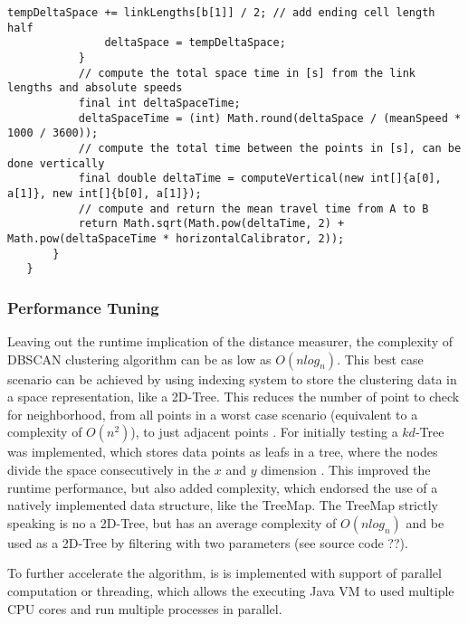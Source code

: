 \begin{lstlisting}[basicstyle=\tiny, style=java, caption={diagonal distance calculation}, label=lst:distance_calc_diagonal]
			   tempDeltaSpace += linkLengths[b[1]] / 2; // add ending cell length half
			   deltaSpace = tempDeltaSpace;
		   }
		   // compute the total space time in [s] from the link lengths and absolute speeds
		   final int deltaSpaceTime;
		   deltaSpaceTime = (int) Math.round(deltaSpace / (meanSpeed * 1000 / 3600));
		   // compute the total time between the points in [s], can be done vertically
		   final double deltaTime = computeVertical(new int[]{a[0], a[1]}, new int[]{b[0], a[1]});
		   // compute and return the mean travel time from A to B
		   return Math.sqrt(Math.pow(deltaTime, 2) + Math.pow(deltaSpaceTime * horizontalCalibrator, 2));
	   }
   }
\end{lstlisting}


\subsubsection{Performance Tuning}
Leaving out the runtime implication of the distance measurer, the complexity of DBSCAN clustering algorithm can be as low as $O(nlog_n)$. This best case scenario can be achieved by using indexing system to store the clustering data in a space representation, like a 2D-Tree. This reduces the number of point to check for neighborhood, from all points in a worst case scenario (equivalent to a complexity of $O(n^2)$), to just adjacent points \parencite{Chauhan2020}. For initially testing a $kd$-Tree was implemented, which stores data points as leafs in a tree, where the nodes divide the space consecutively in the $x$ and $y$ dimension \parencite{Hucker2020,Dalitz2009}. This improved the runtime performance, but also added complexity, which endorsed the use of a natively implemented data structure, like the TreeMap. The TreeMap strictly speaking is no a 2D-Tree, but has an average complexity of $O(nlog_n)$ and be used as a 2D-Tree by filtering with two parameters (see source code ??). \parencite{Baeldung2020_1,Baeldung2020_2}


To further accelerate the algorithm, is is implemented with support of parallel computation or threading, which allows the executing Java VM to used multiple CPU cores and run multiple processes in parallel.

